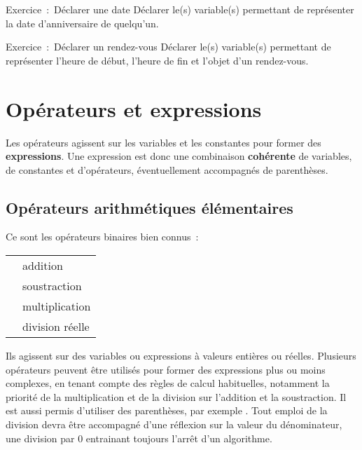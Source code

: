 			
			\begin{Emphase}[exercice]{Exercice~:~Déclarer une date}
				Déclarer le(s) variable(s) permettant de représenter la date
				d’anniversaire de quelqu’un.
			\end{Emphase}
			
			
			\begin{Emphase}[exercice]{Exercice~:~Déclarer un rendez-vous}
				Déclarer le(s) variable(s) permettant de représenter
				l’heure de début, l’heure de fin et
				l’objet d’un rendez-vous.
			\end{Emphase}

	\section{Opérateurs et expressions}
	
		Les opérateurs agissent sur les variables et les constantes pour former
		des \textbf{expressions}. Une expression est donc une combinaison
		\textbf{cohérente} de variables, de constantes et d’opérateurs,
		éventuellement accompagnés de parenthèses.
	
		\subsection{Opérateurs arithmétiques élémentaires}
	
			Ce sont les opérateurs binaires bien connus~:
	
			\begin{center}
			\begin{tabular}{m{1cm}|m{12cm}}
			\raggedleft  \pseudocode{+} & addition\\
			\raggedleft  \pseudocode{-} & soustraction\\
			\raggedleft  \pseudocode{*} & multiplication\\
			\raggedleft  \pseudocode{/} & division réelle\\
			\end{tabular}
			\end{center}
	
			Ils agissent sur des variables ou expressions à valeurs entières ou
			réelles. Plusieurs opérateurs peuvent être utilisés pour former des
			expressions plus ou moins complexes, en tenant compte des règles de
			calcul habituelles, notamment la priorité de la multiplication et de la
			division sur l’addition et la soustraction. Il est aussi permis
			d’utiliser des parenthèses, par exemple . Tout emploi de la division devra être accompagné d’une réflexion
			sur la valeur du dénominateur, une division par 0 entrainant toujours
			l’arrêt d’un algorithme.
	
